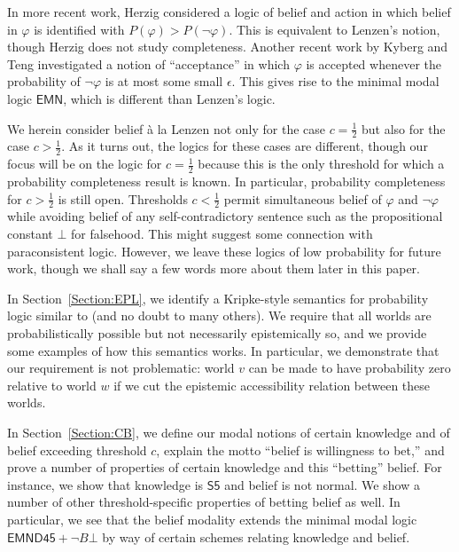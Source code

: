 \documentclass[12pt]{article}
\theoremstyle{definition}
\begin{document}
In more recent work, Herzig \cite{Herzig2003:mpbaa} considered a logic
of belief and action in which belief in $\varphi$ is identified with
$P(\varphi)>P(\lnot \varphi)$. This is equivalent to Lenzen's notion,
though Herzig does not study completeness.  Another recent work by
Kyberg and Teng \cite{KyburgTeng2012:tlorkr} investigated a notion of
``acceptance'' in which $\varphi$ is accepted whenever the probability
of $\lnot\varphi$ is at most some small $\epsilon$.  This gives rise
to the minimal modal logic $\mathsf{EMN}$, which is different than
Lenzen's logic.

We herein consider belief \`{a} la Lenzen not only for the case
$c=\frac 12$ but also for the case $c>\frac 12$.  As it turns out, the
logics for these cases are different, though our focus will be on the
logic for $c=\frac 12$ because this is the only threshold for which a
probability completeness result is known.  In particular, probability
completeness for $c>\frac 12$ is still open.  Thresholds $c<\frac 12$
permit simultaneous belief of $\varphi$ and $\lnot\varphi$ while
avoiding belief of any self-contradictory sentence such as the
propositional constant $\bot$ for falsehood. This might suggest some
connection with paraconsistent logic. However, we leave these logics
of low probability for future work, though we shall say a few words
more about them later in this paper.

In Section~\ref{Section:EPL}, we identify a Kripke-style semantics for
probability logic similar to
\cite{EijckSchwarzentruber2014:epls,Halpern2003:rau} (and no doubt to
many others).  We require that all worlds are probabilistically
possible but not necessarily epistemically so, and we provide some
examples of how this semantics works.  In particular, we demonstrate
that our requirement is not problematic: world $v$ can be made to have
probability zero relative to world $w$ if we cut the epistemic
accessibility relation between these worlds.

In Section~\ref{Section:CB}, we define our modal notions of certain
knowledge and of belief exceeding threshold $c$, explain the motto
``belief is willingness to bet,'' and prove a number of properties of
certain knowledge and this ``betting'' belief.  For instance, we show
that knowledge is $\mathsf{S5}$ and belief is not normal.  We show a
number of other threshold-specific properties of betting belief as
well.  In particular, we see that the belief modality extends the
minimal modal logic $\mathsf{EMND45}+\lnot B\bot$ by way of certain
schemes relating knowledge and belief.
\end{document}
